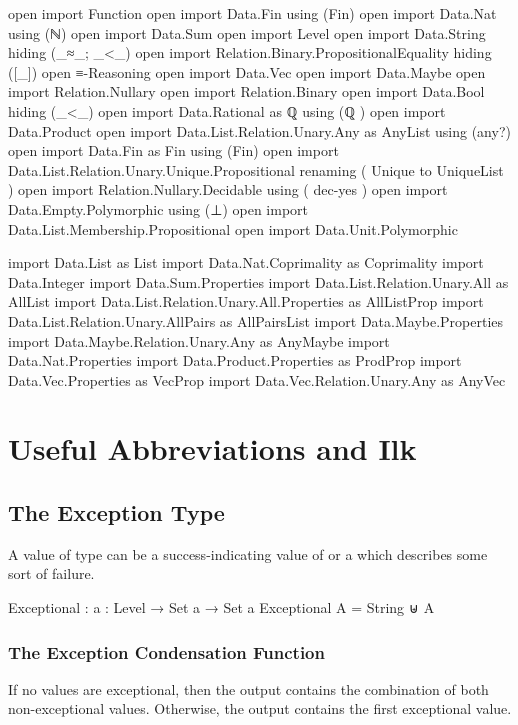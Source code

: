 \documentclass{report}
\begin{document}
\begin{code}
open import Function
open import Data.Fin using (Fin)
open import Data.Nat using (ℕ)
open import Data.Sum
open import Level
open import Data.String hiding (_≈_; _<_)
open import Relation.Binary.PropositionalEquality hiding ([_])
open ≡-Reasoning
open import Data.Vec
open import Data.Maybe
open import Relation.Nullary
open import Relation.Binary
open import Data.Bool hiding (_<_)
open import Data.Rational
  as ℚ
  using (ℚ
        )
open import Data.Product
open import Data.List.Relation.Unary.Any as AnyList using (any?)
open import Data.Fin as Fin using (Fin)
open import Data.List.Relation.Unary.Unique.Propositional
  renaming
    ( Unique to UniqueList
    )
open import Relation.Nullary.Decidable
  using
    ( dec-yes
    )
open import Data.Empty.Polymorphic using (⊥)
open import Data.List.Membership.Propositional
open import Data.Unit.Polymorphic

import Data.List as List
import Data.Nat.Coprimality as Coprimality
import Data.Integer
import Data.Sum.Properties
import Data.List.Relation.Unary.All as AllList
import Data.List.Relation.Unary.All.Properties as AllListProp
import Data.List.Relation.Unary.AllPairs as AllPairsList
import Data.Maybe.Properties
import Data.Maybe.Relation.Unary.Any as AnyMaybe
import Data.Nat.Properties
import Data.Product.Properties as ProdProp
import Data.Vec.Properties as VecProp
import Data.Vec.Relation.Unary.Any as AnyVec
\end{code}

\chapter{Useful Abbreviations and Ilk}

\section{The Exception Type}
A value of type   can be a success-indicating value of  or a  which describes some sort of failure.

\begin{code}
Exceptional : {a : Level} → Set a → Set a
Exceptional A = String ⊎ A
\end{code}

\subsection{The Exception Condensation Function}
If no values are exceptional, then the output contains the combination of both non-exceptional values.  Otherwise, the output contains the first exceptional value.
\end{document}
